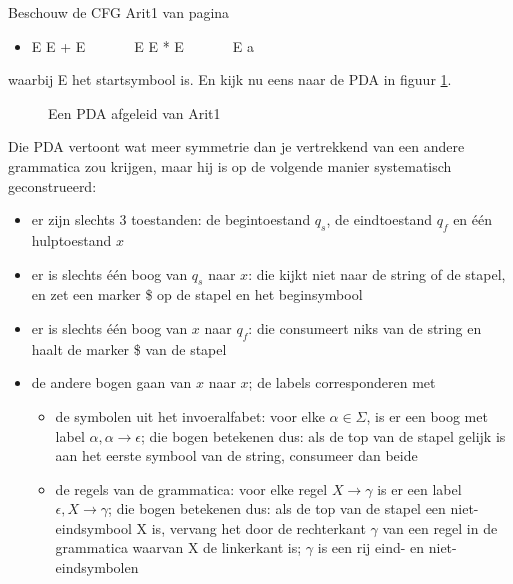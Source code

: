 \begin{vb}
Beschouw de CFG Arit1 van pagina \pageref{arit1label}
\begin{itemize}
\item E \rpijl E + E~~~~~~~E \rpijl E * E~~~~~~~E \rpijl a
\end{itemize}
waarbij E het startsymbool is. En kijk nu eens naar de PDA in figuur
\ref{pda3}.

\begin{figure}[h]
\caption{Een PDA afgeleid van Arit1\label{pda3}}
\end{figure}

Die PDA vertoont wat meer symmetrie dan je vertrekkend van een andere
grammatica zou krijgen, maar hij is op de volgende manier systematisch
geconstrueerd:
%
\begin{itemize}
\item er zijn slechts 3 toestanden: de begintoestand $q_s$, de eindtoestand $q_f$ en \'{e}\'{e}n hulptoestand $x$
\item er is slechts \'{e}\'{e}n boog van $q_s$ naar $x$: die kijkt
niet naar de string of de stapel, en zet een marker \$ op de stapel en
het beginsymbool
\item er is slechts \'{e}\'{e}n boog van $x$ naar $q_f$: die
consumeert niks van de string en haalt de marker \$ van de stapel
\item de andere bogen gaan van $x$ naar $x$; de labels corresponderen met
\begin{itemize}
\item de symbolen uit het invoeralfabet: voor elke $\alpha \in \Sigma$,
is er een boog met label $\alpha,\alpha \rightarrow \epsilon$; die bogen
betekenen dus: als de top van de stapel gelijk is aan het eerste
symbool van de string, consumeer dan beide
\item de regels van de grammatica: voor elke regel $X \rightarrow
\gamma$ is er een label $\epsilon, X \rightarrow \gamma$; die bogen
betekenen dus: als de top van de stapel een niet-eindsymbool X is,
vervang het door de rechterkant $\gamma$ van een regel in de grammatica
waarvan X de linkerkant is; $\gamma$ is een rij eind- en
niet-eindsymbolen
\end{itemize}

\end{itemize}
\end{vb}

